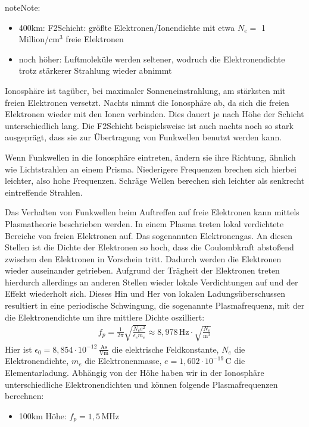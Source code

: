 \documentclass[letterpaper,10pt,english]{jupyterBook}
\begin{document}
\begin{sphinxadmonition}{note}{Note:}
\begin{itemize}
\item {} 
\sphinxhyphen{}400km: F2\sphinxhyphen{}Schicht: größte Elektronen\sphinxhyphen{}/Ionendichte mit etwa \(N_e =\) 1 Million/cm\(^3\) freie Elektronen

\item {} 
\sphinxAtStartPar
noch höher: Luftmoleküle werden seltener, wodruch die Elektronendichte trotz stärkerer Strahlung wieder abnimmt

\end{itemize}

\sphinxAtStartPar
Ionosphäre ist tagüber, bei maximaler Sonneneinstrahlung, am stärksten mit freien Elektronen versetzt. Nachts nimmt die  Ionosphäre ab, da sich die freien Elektronen wieder mit den Ionen verbinden. Dies dauert je nach Höhe der Schicht unterschiedlich lang. Die F2\sphinxhyphen{}Schicht beispielsweise ist auch nachts noch so stark ausgeprägt, dass sie zur Übertragung von Funkwellen benutzt werden kann.

\sphinxAtStartPar
Wenn Funkwellen in die Ionosphäre eintreten, ändern sie ihre Richtung, ähnlich wie Lichtstrahlen an einem Prisma. Niederigere Frequenzen brechen sich hierbei leichter, also hohe Frequenzen. Schräge Wellen berechen sich leichter als senkrecht eintreffende Strahlen.

\sphinxAtStartPar
Das Verhalten von Funkwellen beim Auftreffen auf freie Elektronen kann mittels Plasmatheorie beschrieben werden. In einem Plasma treten lokal verdichtete Bereiche von freien Elektronen auf. Das sogenannten Elektronengas. An diesen Stellen ist die Dichte der Elektronen so hoch, dass die Coulombkraft abstoßend zwischen den Elektronen in Vorschein tritt. Dadurch werden die Elektronen wieder auseinander getrieben. Aufgrund der Trägheit der Elektronen treten hierdurch allerdings an anderen Stellen wieder lokale Verdichtungen auf und der Effekt wiederholt sich. Dieses Hin und Her von lokalen Ladungsüberschussen resultiert in eine periodische Schwingung, die sogenannte Plasmafrequenz, mit der die Elektronendichte um ihre mittlere Dichte oszilliert:
\begin{equation*}
\begin{split}f_p = \frac{1}{2\pi}\sqrt{\frac{N_e e^2}{\epsilon_e m_e}} \approx 8,978\,\mathrm{Hz} \cdot \sqrt{\frac{N_e}{\mathrm{m^3}}}\end{split}
\end{equation*}
\sphinxAtStartPar
Hier ist \(\epsilon_0 = 8,854\cdot 10^{-12}\,\mathrm{\frac{As}{Vm}}\) die elektrische Feldkonstante, \(N_e\) die Elektronendichte, \(m_e\) die Elektronenmasse, \(e = 1,602\cdot 10^{-19}\,\mathrm{C}\) die Elementarladung. Abhängig von der Höhe haben wir in der Ionosphäre unterschiedliche Elektronendichten und können folgende Plasmafrequenzen berechnen:
\begin{itemize}
\item {} 
\sphinxAtStartPar
100km Höhe: \(f_p = 1,5\,\mathrm{MHz}\)


\end{itemize}
\end{sphinxadmonition}
\end{document}
